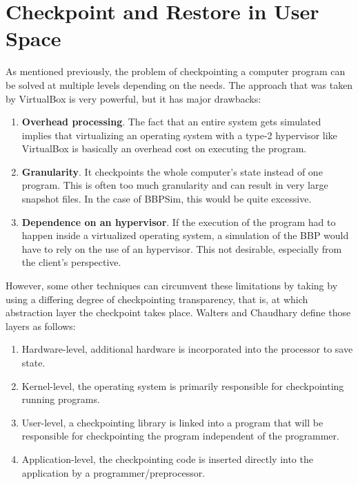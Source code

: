 \section{Checkpoint and Restore in User Space}\label{sec:criu}
As mentioned previously, the problem of checkpointing a computer program can be solved at multiple levels depending on the needs. The approach that was taken by VirtualBox is very powerful, but it has major drawbacks:
\begin{enumerate}
	\item \textbf{Overhead processing}. The fact that an entire system gets simulated implies that virtualizing an operating system with a type-2 hypervisor like VirtualBox is basically an overhead cost on executing the program. 
	\item \textbf{Granularity}. It checkpoints the whole computer's state instead of one program. This is often too much granularity and can result in very large snapshot files. In the case of \gls{BBPSim}, this would be quite excessive.
	\item \textbf{Dependence on an hypervisor}. If the execution of the program had to happen inside a virtualized operating system, a simulation of the \gls{BBP} would have to rely on the use of an hypervisor. This not desirable, especially from the client's perspective.
\end{enumerate}

However, some other techniques can circumvent these limitations by taking by using a differing degree of checkpointing transparency, that is, at which abstraction layer the checkpoint takes place. Walters and Chaudhary define those layers as follows: 
\begin{shadedquotation}
\begin{enumerate}
	\item Hardware-level, additional hardware is incorporated into the processor to
save state.
	\item Kernel-level, the operating system is primarily responsible for checkpointing
running programs.
	\item User-level, a checkpointing library is linked into a program that will be responsible for checkpointing the program independent of the programmer.
	\item Application-level, the checkpointing code is inserted directly into the application by a programmer/preprocessor.
\end{enumerate}
\cite{paper:app-level-chkpt}
\end{shadedquotation}

